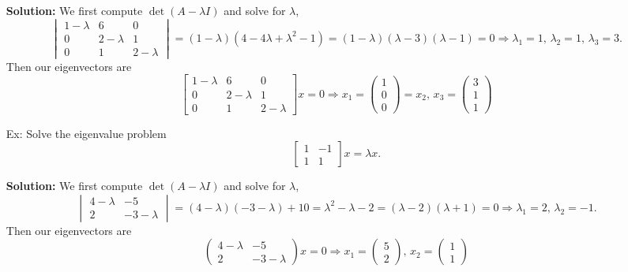 \documentclass[reqno]{amsart}
\theoremstyle{definition}
\begin{document}
\begin{enumerate}
\textbf{Solution:  }  We first compute $\det(A-\lambda I)$ and solve for $\lambda$,
%
\begin{equation*}
\begin{vmatrix}
1-\lambda & 6 & 0\\
0 & 2-\lambda & 1\\
0 & 1 & 2-\lambda
\end{vmatrix} = (1-\lambda)(4-4\lambda + \lambda^2 - 1) = (1-\lambda)(\lambda - 3)(\lambda - 1) = 0
\Rightarrow \lambda_1 = 1,\, \lambda_2 = 1,\, \lambda_3 = 3.
\end{equation*}
%
Then our eigenvectors are
%
\begin{equation*}
\begin{bmatrix}
1 - \lambda & 6 & 0\\
0 & 2-\lambda & 1\\
0 & 1 & 2-\lambda
\end{bmatrix}x = 0 \Rightarrow x_1 = \begin{pmatrix}
1\\
0\\
0
\end{pmatrix} = x_2,\, x_3 = \begin{pmatrix}
3\\
1\\
1
\end{pmatrix}
\end{equation*}

\item[Ex:  ]  Solve the eigenvalue problem
%
\begin{equation*}
\begin{bmatrix}
1 & -1\\
1 & 1
\end{bmatrix}x = \lambda x.
\end{equation*}
%

\textbf{Solution:  } We first compute $\det(A-\lambda I)$ and solve for $\lambda$,
%
\begin{equation*}
\begin{vmatrix}
4-\lambda & -5\\
2 & -3-\lambda
\end{vmatrix} = (4-\lambda)(-3-\lambda) + 10 = \lambda^2 - \lambda - 2 = (\lambda - 2)(\lambda + 1) = 0 \Rightarrow \lambda_1 = 2,\, \lambda_2 = -1.
\end{equation*}
%
Then our eigenvectors are
%
\begin{equation*}
\begin{pmatrix}
4-\lambda & -5\\
2 & -3-\lambda
\end{pmatrix}x = 0 \Rightarrow x_1 = \begin{pmatrix}
5\\
2
\end{pmatrix},\, x_2 = \begin{pmatrix}
1\\
1
\end{pmatrix}
\end{equation*}

\end{enumerate}
\end{document}
